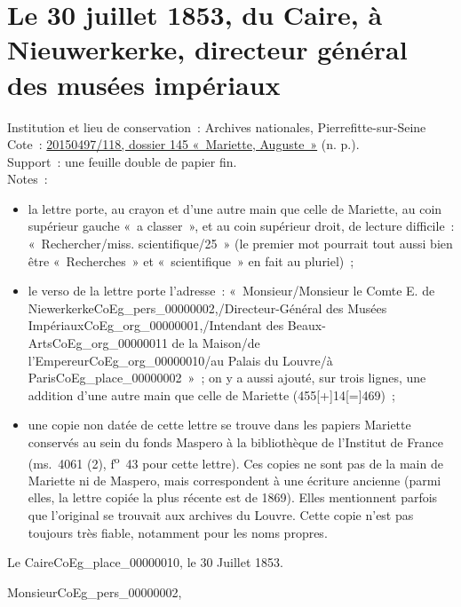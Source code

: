 \documentclass{book}
\begin{document}
\hypertarget{CoEg_Mariette_1853-07-30}{}
\section*{Le 30 juillet 1853, du Caire, à Nieuwerkerke, directeur général des musées impériaux}
{\footnotesize \noindent Institution et lieu de conservation~: Archives nationales, Pierrefitte-sur-Seine\\
Cote~: \hyperlink{CoEg_Mariette_ms_001}{20150497/118, dossier 145 «~Mariette, Auguste~»} (n. p.).\\
Support~: une feuille double de papier fin.\\
Notes~: \begin{itemize} \item la lettre porte, au crayon et d’une autre main que celle de Mariette, au coin supérieur gauche «~a classer~», et au coin supérieur droit, de lecture difficile~: «~Rechercher/miss. scientifique/25~» (le premier mot pourrait tout aussi bien être «~Recherches~» et «~scientifique~» en fait au pluriel)~; 
\item le verso de la lettre porte l’adresse~: «~Monsieur/Monsieur le Comte E. de Niewerkerke\gls{CoEg_pers_00000002},/Directeur-Général des Musées Impériaux\gls{CoEg_org_00000001},/Intendant des Beaux-Arts\gls{CoEg_org_00000011} de la Maison/de l’Empereur\gls{CoEg_org_00000010}/au Palais du Louvre/à Paris\gls{CoEg_place_00000002}~»~; on y a aussi ajouté, sur trois lignes, une addition d’une autre main que celle de Mariette (455[+]14[=]469)~;
\item une copie non datée de cette lettre se trouve dans les papiers Mariette conservés au sein du fonds Maspero à la bibliothèque de l’Institut de France (ms.~4061 (2), f\textsuperscript{o}~43 pour cette lettre). Ces copies ne sont pas de la main de Mariette ni de Maspero, mais correspondent à une écriture ancienne (parmi elles, la lettre copiée la plus récente est de 1869). Elles mentionnent parfois que l’original se trouvait aux archives du Louvre. Cette copie n’est pas toujours très fiable, notamment pour les noms propres.\end{itemize}}
\begin{flushright}Le Caire\gls{CoEg_place_00000010}, le 30 Juillet 1853.\end{flushright}

\hspace{1cm} Monsieur\gls{CoEg_pers_00000002},\\
\end{document}
